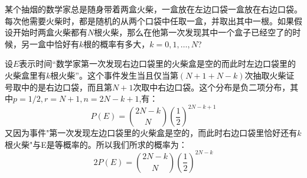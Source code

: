 \documentclass[10pt,a4paper,UTF8]{article}
\begin{document}
\begin{tikzproblem}
某个抽烟的数学家总是随身带着两盒火柴，一盒放在左边口袋一盒放在右边口袋。每次他需要火柴时，都是随机的从两个口袋中任取一盒，并取出其中一根。如果假设开始时两盒火柴都有\(N\)根火柴，那么在他第一次发现其中一个盒子已经空了的时候，另一盒中恰好有\(k\)根的概率有多大，\(k=0,1,\ldots ,N\)?
\end{tikzproblem}

\begin{tikzanswer}
设\(E\)表示时间“数学家第一次发现右边口袋里的火柴盒是空的而此时左边口袋里的火柴盒里有\(k\)根火柴”。这个事件发生当且仅当第\((N+1+N-k)\)次抽取火柴证号取中的是右边口袋，而且第\(N+1\)次取中右边口袋。这个分布是负二项分布，其中\(p=1/2, r=N+1, n=2N-k+1\),有：
\begin{equation}
\label{eq:8}
P(E) = \binom{2N-k}{N}(\frac{1}{2})^{2N-k+1}
\end{equation}
又因为事件"第一次发现左边口袋里的火柴盒是空的，而此时右边口袋里恰好还有\(k\)根火柴"与E是等概率的。所以我们所求的概率为：
\begin{equation}
\label{eq:9}
2P(E) = \binom{2N-k}{N}(\frac{1}{2})^{2N-k}
\end{equation}
\end{tikzanswer}
\end{document}

